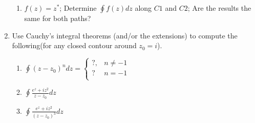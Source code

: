\documentclass[12pt]{article}
\begin{document}
\begin{enumerate}
\begin{enumerate}
		\item $f(z)=z^{*}$; Determine $\oint f(z)dz$ along $C1$ and $C2$; Are the results the same for both paths?

		\end{enumerate}

	\item Use Cauchy's integral theorems (and/or the extensions) to compute the following(for any closed contour around $z_{0} = i$).
		\begin{enumerate}

			\item $\oint (z-z_{0})^{n}dz =  
		  \begin{cases} 
          ?, & n \neq -1 \\
          ? & n = -1 \\
  \end{cases} $

  \item $\oint \frac{e^{z}+iz^{2}}{z-z_{0}}dz$
	  \item $\oint \frac{e^{z}+iz^{2}}{(z-z_{0})^{3}}dz$
    

		\end{enumerate}

\end{enumerate}
\end{document}
